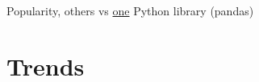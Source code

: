 
\begin{frame}
    

    Popularity, others vs \underline{one} Python library (pandas)

    \begin{figure}
       \begin{center}
       \end{center}
    \end{figure}


\end{frame}






\section{Trends}

